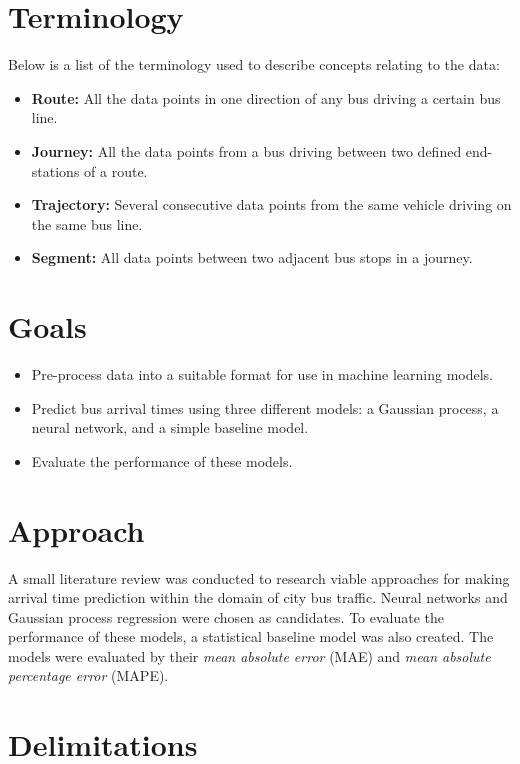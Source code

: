 \section{Terminology}
\label{sec:terminology}
Below is a list of the terminology used to describe concepts relating to the data:
\begin{itemize}
\item \textbf{Route:} All the data points in one direction of any bus driving a certain bus line.
\item \textbf{Journey:} All the data points from a bus driving between two defined end-stations of a route.
\item \textbf{Trajectory:} Several consecutive data points from the same vehicle driving on the same bus line.
\item \textbf{Segment:} All data points between two adjacent bus stops in a journey.
\\
\end{itemize}

\section{Goals}
\label{sec:aim}

\begin{itemize}[]
  \item Pre-process data into a suitable format for use in machine learning models.
  \item Predict bus arrival times using three different models: a Gaussian process, a neural network, and a simple baseline model.
  \item Evaluate the performance of these models.
\end{itemize}

\section{Approach}
\label{sec:research-questions}

A small literature review was conducted to research viable approaches for making arrival time prediction within the domain of city bus traffic. Neural networks and Gaussian process regression were chosen as candidates. To evaluate the performance of these models, a statistical baseline model was also created. The models were evaluated by their \textit{mean absolute error} (MAE) and \textit{mean absolute percentage error} (MAPE). 


\section{Delimitations}
\label{sec:delimitations}

